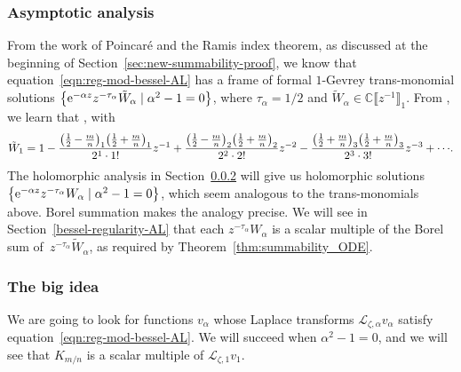 \documentclass[pdftex]{sigma}
\newcommand{\C}{\mathbb{C}}
\newcommand{\series}[1]{\tilde{#1}}
\newcommand{\laplace}{\mathcal{L}}
\numberwithin{equation}{section}
\begin{document}
\subsubsection{Asymptotic analysis}\label{sec:asympt-AL}
%
From the work of Poincar\'e and the Ramis index theorem, as discussed at the beginning of Section~\ref{sec:new-summability-proof}, we know that equation~\eqref{eqn:reg-mod-bessel-AL} has a frame of formal $1$-Gevrey trans-monomial solutions
$\big\{ {\rm e}^{-\alpha z} z^{-\tau_\alpha} \series{W}_\alpha \mid \alpha^2 - 1 = 0 \big\}$,
where $\tau_\alpha = 1/2$ and $\series{W}_\alpha\in\C\big\llbracket z^{-1} \big\rrbracket_1$. From \cite[equations~(10.40.2) and (10.17.1)]{dlmf}, we learn that \smash{$K_{m/n} \sim \bigl(\frac{\pi}{2}\bigr)^{1/2} {\rm e}^{-z} z^{-1/2} \series{W}_1$}, with
\begin{gather*}%
\series{W}_1 = 1 - \frac{\bigl(\frac{1}{2}\hspace{-0.5pt}-\hspace{-0.5pt}\frac{m}{n}\bigr)_1 \bigl(\frac{1}{2}\hspace{-0.5pt}+\hspace{-0.5pt}\frac{m}{n}\bigr)_1}{2^1 \cdot 1!} z^{-1} + \frac{\bigl(\frac{1}{2}\hspace{-0.5pt}-\hspace{-0.5pt}\frac{m}{n}\bigr)_2 \bigl(\frac{1}{2}\hspace{-0.5pt}+\hspace{-0.5pt}\frac{m}{n}\bigr)_2}{2^2 \cdot 2!} z^{-2} - \frac{\bigl(\frac{1}{2}\hspace{-0.5pt}+\hspace{-0.5pt}\frac{m}{n}\bigr)_3 \bigl(\frac{1}{2}\hspace{-0.5pt}+\hspace{-0.5pt}\frac{m}{n}\bigr)_3}{2^3 \cdot 3!} z^{-3} + \cdots\!.
\end{gather*}
The holomorphic analysis in Section~\ref{big-idea} will give us holomorphic solutions
$\big\{ {\rm e}^{-\alpha z} z^{-\tau_\alpha} W_\alpha \mid \alpha^2 - 1 = 0 \big\}$,
which seem analogous to the trans-monomials above. Borel summation makes the analogy precise. We will see in Section~\ref{bessel-regularity-AL} that each $z^{-\tau_\alpha} W_\alpha$ is a scalar multiple of the Borel sum of~$z^{-\tau_\alpha} \series{W}_\alpha$, as required by Theorem~\ref{thm:summability_ODE}.
%
\subsubsection{The big idea}\label{big-idea}
%
We are going to look for functions $v_\alpha$ whose Laplace transforms $\laplace_{\zeta, \alpha} v_\alpha$ satisfy equation~\eqref{eqn:reg-mod-bessel-AL}. We will succeed when $\alpha^2 - 1 = 0$, and we will see that $K_{m/n}$ is a scalar multiple of $\laplace_{\zeta, 1} v_1$.
\end{document}
